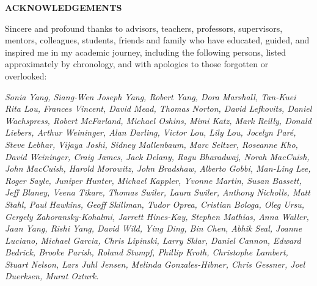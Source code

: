 \begin{centering}
\textbf{ACKNOWLEDGEMENTS}\\
\vspace{\baselineskip}
\end{centering}

Sincere and profound thanks to advisors, teachers, professors, supervisors, mentors, colleagues, students, friends and family who have educated, guided, and inspired me in my academic journey, including the following persons, listed approximately by chronology, and with apologies to those forgotten or overlooked:

\textit{Sonia Yang, Siang-Wen Joseph Yang, Robert Yang, Dora Marshall, Tan-Kuei Rita Lou, Frances Vincent, David Mead, Thomas Norton, David Lefkovits, Daniel Wachspress, Robert McFarland, Michael Oshins, Mimi Katz, Mark Reilly, Donald Liebers, Arthur Weininger, Alan Darling, Victor Lou, Lily Lou, Jocelyn Par\'e, Steve Lebhar, Vijaya Joshi, Sidney Mallenbaum, Marc Seltzer, Roseanne Kho, David Weininger, Craig James, Jack Delany, Ragu Bharadwaj, Norah MacCuish, John MacCuish, Harold Morowitz, John Bradshaw, Alberto Gobbi, Man-Ling Lee, Roger Sayle, Juniper Hunter, Michael Kappler, Yvonne Martin, Susan Bassett, Jeff Blaney, Veena Tikare, Thomas Swiler, Laura Swiler, Anthony Nicholls, Matt Stahl, Paul Hawkins, Geoff Skillman, Tudor Oprea, Cristian Bologa, Oleg Ursu, Gergely Zahoransky-Kohalmi, Jarrett Hines-Kay, Stephen Mathias, Anna Waller, Jaan Yang, Rishi Yang, David Wild, Ying Ding, Bin Chen, Abhik Seal, Joanne Luciano, Michael Garcia, Chris Lipinski, Larry Sklar, Daniel Cannon, Edward Bedrick, Brooke Parish, Roland Stumpf, Phillip Kroth, Christophe Lambert, Stuart Nelson, Lars Juhl Jensen, Melinda Gonzales-Hibner, Chris Gessner, Joel Duerksen, Murat Ozturk.}
